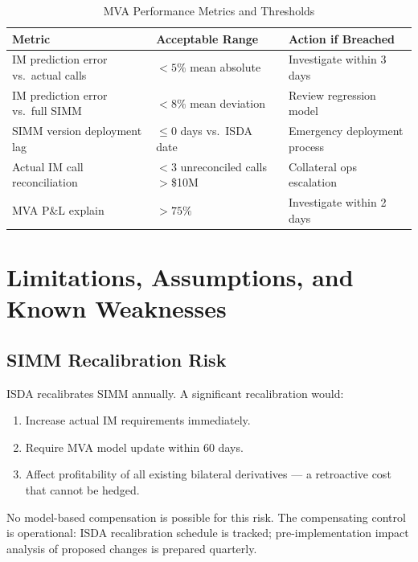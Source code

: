 \documentclass[11pt,a4paper]{article}
\begin{document}
\begin{table}[h!]
\centering
\caption{MVA Performance Metrics and Thresholds}
\begin{tabular}{@{}lll@{}}
\toprule
\textbf{Metric} & \textbf{Acceptable Range} & \textbf{Action if Breached} \\
\midrule
IM prediction error vs.\ actual calls & $<5\%$ mean absolute & Investigate within 3 days \\
IM prediction error vs.\ full SIMM    & $<8\%$ mean deviation & Review regression model \\
SIMM version deployment lag           & $\leq 0$ days vs.\ ISDA date & Emergency deployment process \\
Actual IM call reconciliation         & $<3$ unreconciled calls $>$\$10M & Collateral ops escalation \\
MVA P\&L explain                      & $>75\%$ & Investigate within 2 days \\
\bottomrule
\end{tabular}
\end{table}

\section{Limitations, Assumptions, and Known Weaknesses}

\subsection{SIMM Recalibration Risk}

ISDA recalibrates SIMM annually. A significant recalibration would:
\begin{enumerate}[leftmargin=*]
  \item Increase actual IM requirements immediately.
  \item Require MVA model update within 60 days.
  \item Affect profitability of all existing bilateral derivatives --- a retroactive cost that cannot be hedged.
\end{enumerate}

No model-based compensation is possible for this risk. The compensating control is operational:
ISDA recalibration schedule is tracked; pre-implementation impact analysis of proposed changes
is prepared quarterly.
\end{document}
